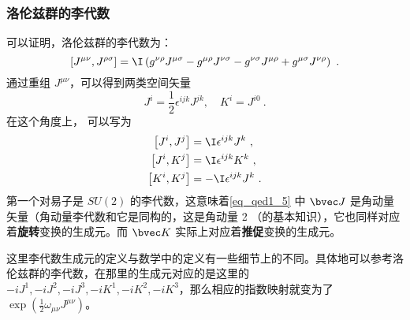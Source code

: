 \subsubsection{洛伦兹群的李代数}
可以证明，洛伦兹群的李代数为：
\begin{equation}\left[J^{\mu \nu}, J^{\rho \sigma}\right]=\I\left(g^{\nu \rho} J^{\mu \sigma}-g^{\mu \rho} J^{\nu \sigma}-g^{\nu \sigma} J^{\mu \rho}+g^{\mu \sigma} J^{\nu \rho}\right)~.\end{equation}
通过重组 $J^{\mu\nu}$，可以得到两类空间矢量
\begin{equation}\label{eq_qed1_5}J^{i}=\frac{1}{2} \epsilon^{i j k} J^{j k}, \quad K^{i}=J^{i 0}~.\end{equation}
在这个角度上， 可以写为
\begin{equation}\begin{aligned}
\left[J^{i}, J^{j}\right] &=\I \epsilon^{i j k} J^{k}~, \\
\left[J^{i}, K^{j}\right] &=\I \epsilon^{i j k} K^{k}~, \\
\left[K^{i}, K^{j}\right] &=-\I \epsilon^{i j k} J^{k}~.
\end{aligned}\end{equation}
第一个对易子是 $SU(2)$ 的李代数，这意味着\autoref{eq_qed1_5} 中 $\bvec J$ 是角动量矢量（角动量李代数和它是同构的，这是角动量 2 （的基本知识），它也同样对应着\textbf{旋转}变换的生成元。而 $\bvec K$ 实际上对应着\textbf{推促}变换的生成元。

这里李代数生成元的定义与数学中的定义有一些细节上的不同。具体地可以参考洛伦兹群的李代数，在那里的生成元对应的是这里的 $-iJ^1,-iJ^2,-iJ^3,-iK^1,-iK^2,-iK^3$，那么相应的指数映射就变为了 $\exp(\frac{1}{2}\omega_{\mu\nu}J^{\mu\nu})$。
